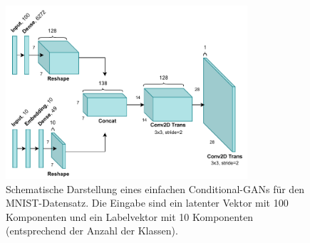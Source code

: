 \begin{figure}
    \centering
    \includegraphics[width=0.8\textwidth]{images/cgan.pdf}
    \caption{Schematische Darstellung eines einfachen Conditional-GANs für den MNIST-Datensatz. Die Eingabe sind ein latenter Vektor mit 100 Komponenten und ein Labelvektor mit 10 Komponenten (entsprechend der Anzahl der Klassen).}
    \label{fig:cgan}
\end{figure}
